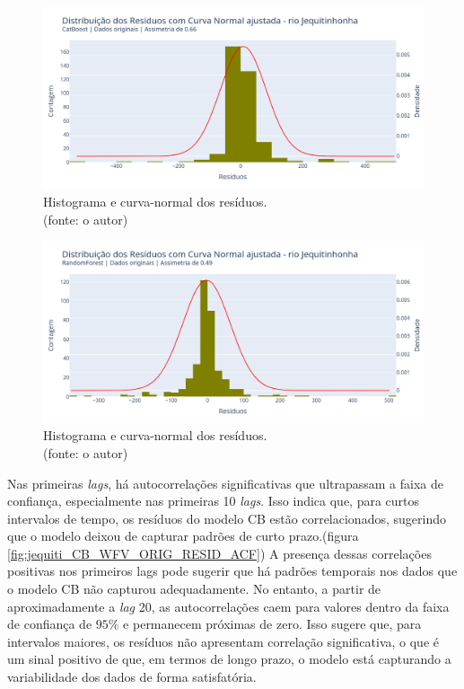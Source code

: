 \begin{figure}[!h]
	\centering
	\includegraphics[scale=0.33]{Figuras/jequiti/wfv/CB/CB_WFV_ORIG_RESID_x_CURVA_NORMAL.png}
	\caption{Histograma e curva-normal dos resíduos.\\(fonte: o autor)}
	\label{fig:jequiti_CB_WFV_ORIG_RESID_x_CURVA_NORMAL}
\end{figure}

\begin{figure}[!h]
	\centering
	\includegraphics[scale=0.33]{Figuras/jequiti/wfv/RF/RF_WFV_ORIG_RESID_x_CURVA_NORMAL.png}
	\caption{Histograma e curva-normal dos resíduos.\\(fonte: o autor)}
	\label{fig:jequiti_RF_WFV_ORIG_RESID_x_CURVA_NORMAL}
\end{figure}
\clearpage

Nas primeiras \textit{lags}, há autocorrelações significativas que ultrapassam a faixa de confiança, especialmente nas primeiras 10 \textit{lags}. Isso indica que, para curtos intervalos de tempo, os resíduos do modelo CB estão correlacionados, sugerindo que o modelo deixou de capturar padrões de curto prazo.(figura \ref{fig:jequiti_CB_WFV_ORIG_RESID_ACF}) A presença dessas correlações positivas nos primeiros lags pode sugerir que há padrões temporais nos dados que o modelo CB não capturou adequadamente. No entanto, a partir de aproximadamente a \textit{lag} 20, as autocorrelações caem para valores dentro da faixa de confiança de $95\%$ e permanecem próximas de zero. Isso sugere que, para intervalos maiores, os resíduos não apresentam correlação significativa, o que é um sinal positivo de que, em termos de longo prazo, o modelo está capturando a variabilidade dos dados de forma satisfatória.

